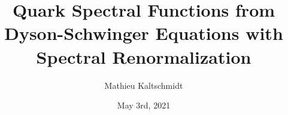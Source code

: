 \title{Quark Spectral Functions from Dyson-Schwinger Equations with Spectral Renormalization}
\author{Mathieu Kaltschmidt}
\date{May 3rd, 2021}

\usepackage{xcolor}


\usepackage{fancyhdr}
\fancyhfoffset{0pt}

\usepackage[a4paper,
			width = 150mm,
			top = 30mm,
		    bottom=30mm,
		    ]{geometry}
\usepackage[onehalfspacing]{setspace}


\makeatletter
\pagestyle{fancy}
\fancyhf{}
\fancyhead[L]{\footnotesize\nouppercase\leftmark}
\fancyfoot[C]{\thepage}
\renewcommand{\headrulewidth}{0.2pt}
\renewcommand{\footrulewidth}{0pt}
\makeatother



\usepackage{amsmath, amssymb, commath, mathtools}
\usepackage{physics}
\usepackage{slashed}
\usepackage{xfrac}
\usepackage[separate-uncertainty]{siunitx}
\usepackage{relsize} %
\usepackage{bbm}
\usepackage{chngcntr}
\usepackage[amsmath,thmmarks,hyperref]{ntheorem}
\usepackage{wasysym}
\usepackage{bbold}

\RequirePackage{xfrac, relsize, bbm, chngcntr} %
\RequirePackage[export]{adjustbox}


\usepackage{subfigure}

\theoremstyle{nonumberbreak}
\theoremseparator{} 
\theoremsymbol{\ensuremath{\square}}
\newtheorem{proof}{\textit{Proof.}}

\usepackage{array} %
\usepackage{booktabs} %

\usepackage{fontspec, xunicode}
\usepackage[utf8]{inputenc}
\usepackage{lmodern}
\setmainfont{Palatino}
\setsansfont{Optima}
\setmonofont[Scale=MatchLowercase]{Menlo}
\usepackage{polyglossia}
\setmainlanguage{english}
\usepackage{microtype}
\usepackage{scrextend} %
\usepackage{csquotes}
\usepackage{graphicx} %
\usepackage{float} %
\usepackage{blindtext} %
\usepackage[labelfont=bf]{caption} %
\usepackage{tikz}
\usetikzlibrary{patterns, decorations.markings}
\usepackage{tcolorbox}


